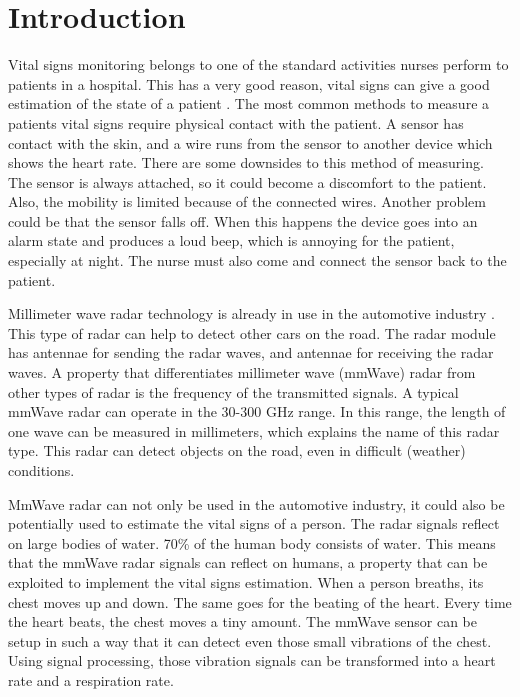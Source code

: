 \chapter{Introduction}
\label{chp:introduction}
Vital signs monitoring belongs to one of the standard activities nurses perform to patients in a hospital. This has a very good reason, vital signs can give a good estimation of the state of a patient \cite{mok2015vital}. The most common methods to measure a patients vital signs require physical contact with the patient. A sensor has contact with the skin, and a wire runs from the sensor to another device which shows the heart rate. There are some downsides to this method of measuring. The sensor is always attached, so it could become a discomfort to the patient. Also, the mobility is limited because of the connected wires. Another problem could be that the sensor falls off. When this happens the device goes into an alarm state and produces a loud beep, which is annoying for the patient, especially at night. The nurse must also come and connect the sensor back to the patient.

Millimeter wave radar technology is already in use in the automotive industry \cite{mmwave_automotive}. This type of radar can help to detect other cars on the road. The radar module has antennae for sending the radar waves, and antennae for receiving the radar waves. A property that differentiates millimeter wave (mmWave) radar from other types of radar is the frequency of the transmitted signals. A typical mmWave radar can operate in the 30-300 GHz range. In this range, the length of one wave can be measured in millimeters, which explains the name of this radar type. This radar can detect objects on the road, even in difficult (weather) conditions. 

MmWave radar can not only be used in the automotive industry, it could also be potentially used to estimate the vital signs of a person. The radar signals reflect on large bodies of water. 70\% of the human body consists of water. This means that the mmWave radar signals can reflect on humans, a property that can be exploited to implement the vital signs estimation. When a person breaths, its chest moves up and down. The same goes for the beating of the heart. Every time the heart beats, the chest moves a tiny amount. The mmWave sensor can be setup in such a way that it can detect even those small vibrations of the chest. Using signal processing, those vibration signals can be transformed into a heart rate and a respiration rate. 

